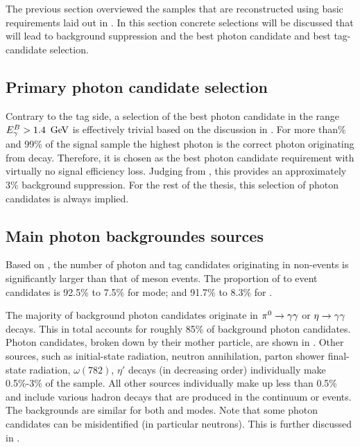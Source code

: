 The previous section overviewed the samples that are reconstructed using basic requirements laid out in .
In this section concrete selections will be discussed that will lead to background suppression and the best photon candidate
and best tag-candidate selection.

\subsection{Primary photon candidate selection}\label{sec:primary_photon_candidate_selection}
Contrary to the tag side, a selection of the best photon candidate in the range ${E^B_{\gamma}}>1.4~\mathrm{\,Ge\kern -0.1em V}$ 
is effectively trivial based on the discussion in .
For more than\% and 99\% of the signal \MC sample the highest \EB photon 
is the correct photon originating from \BtoXsgamma decay.
Therefore, it is chosen as the best photon candidate requirement with virtually no signal efficiency loss.
Judging from , this provides an approximately 3\% background suppression.
For the rest of the thesis, this selection of photon candidates is always implied.

\subsection{Main photon backgroundes sources}\label{sec:main_background_sources}

Based on , the number of photon and tag candidates originating 
in non-\BB events is significantly larger than that of \B meson events.
The proportion of \qqbar to \BB event candidates is 92.5\% to 7.5\% for \feiBp mode;
and 91.7\% to 8.3\% for \feiBz.

The majority of background photon candidates originate in $\pi^0\rightarrow\gamma\gamma$ or $\eta\rightarrow\gamma\gamma$ decays.
This in total accounts for roughly 85\% of background photon candidates.
Photon candidates, broken down by their mother particle, are shown in .
Other sources, such as initial-state radiation, neutron annihilation, parton shower final-state radiation, $\omega(782)$, $\eta'$ decays (in decreasing order) individually make 0.5\%-3\% of the sample.
All other sources individually make up less than 0.5\% and include various hadron decays that are produced in the continuum or \B events.
The backgrounds are similar for both \feiBp and \feiBz modes.
Note that some photon candidates can be misidentified (in particular neutrons). 
This is further discussed in .

